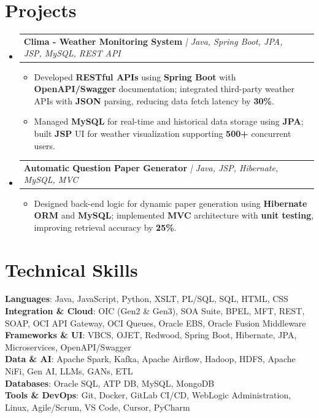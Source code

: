 \documentclass[letterpaper,11pt]{article}
\makeatletter
\newcommand{\resumeItem}[1]{
  \item\small{
    {#1 \vspace{-2pt}}
  }
}
\newcommand{\resumeProjectHeading}[2]{
    \item
    \begin{tabular*}{0.97\textwidth}{l@{\extracolsep{\fill}}r}
      \small#1 & #2 \\
    \end{tabular*}\vspace{-7pt}
}
\newcommand{\resumeSubHeadingListStart}{\begin{itemize}[leftmargin=0.15in, label={}]}
\newcommand{\resumeSubHeadingListEnd}{\end{itemize}}
\newcommand{\resumeItemListStart}{\begin{itemize}}
\newcommand{\resumeItemListEnd}{\end{itemize}\vspace{-5pt}}
\makeatother
\begin{document}
\vspace{-6pt}

\section{Projects}
\resumeSubHeadingListStart
    \resumeProjectHeading
        {\textbf{Clima - Weather Monitoring System} \textit{| Java, Spring Boot, JPA, JSP, MySQL, REST API}}{}
    \resumeItemListStart
        \resumeItem{Developed \textbf{RESTful APIs} using \textbf{Spring Boot} with \textbf{OpenAPI/Swagger} documentation; integrated third-party weather APIs with \textbf{JSON} parsing, reducing data fetch latency by \textbf{30\%}.}
        \resumeItem{Managed \textbf{MySQL} for real-time and historical data storage using \textbf{JPA}; built \textbf{JSP} UI for weather visualization supporting \textbf{500+} concurrent users.}
    \resumeItemListEnd
    \resumeProjectHeading
        {\textbf{Automatic Question Paper Generator} \textit{| Java, JSP, Hibernate, MySQL, MVC}}{}
    \resumeItemListStart
        \resumeItem{Designed back-end logic for dynamic paper generation using \textbf{Hibernate ORM} and \textbf{MySQL}; implemented \textbf{MVC} architecture with \textbf{unit testing}, improving retrieval accuracy by \textbf{25\%}.}
    \resumeItemListEnd
\resumeSubHeadingListEnd

\vspace{-6pt}

\section{Technical Skills}
\begin{itemize}[leftmargin=0.15in, label={}]
    \small{\item{
        \textbf{Languages}{: Java, JavaScript, Python, XSLT, PL/SQL, SQL, HTML, CSS} \\
        \textbf{Integration \& Cloud}{: OIC (Gen2 \& Gen3), SOA Suite, BPEL, MFT, REST, SOAP, OCI API Gateway, OCI Queues, Oracle EBS, Oracle Fusion Middleware} \\
        \textbf{Frameworks \& UI}{: VBCS, OJET, Redwood, Spring Boot, Hibernate, JPA, Microservices, OpenAPI/Swagger} \\
        \textbf{Data \& AI}{: Apache Spark, Kafka, Apache Airflow, Hadoop, HDFS, Apache NiFi, Gen AI, LLMs, GANs, ETL} \\
        \textbf{Databases}{: Oracle SQL, ATP DB, MySQL, MongoDB} \\
        \textbf{Tools \& DevOps}{: Git, Docker, GitLab CI/CD, WebLogic Administration, Linux, Agile/Scrum, VS Code, Cursor, PyCharm}
    }}
\end{itemize}
\end{document}
